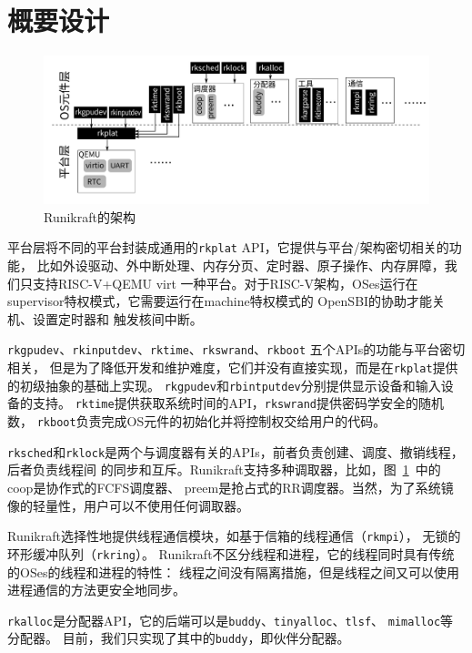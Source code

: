 \documentclass{../runikraft-report}
\begin{document}
\section{概要设计}
\begin{figure}[!hbt]
\centering
\includegraphics[width=\linewidth]{../assets/Runikraft-architecture-impl.pdf}
\caption{Runikraft的架构}\label{fig:runikraft-arch-impl}
\end{figure}
平台层将不同的平台封装成通用的\texttt{rkplat} API，它提供与平台/架构密切相关的功能，
比如外设驱动、外中断处理、内存分页、定时器、原子操作、内存屏障，我们只支持RISC-V+QEMU virt
一种平台。对于RISC-V架构，OSes运行在supervisor特权模式，它需要运行在machine特权模式的
OpenSBI\cite{bib:feasibility-5}\cite{bib:feasibility-6}的协助才能关机、设置定时器和
触发核间中断。

\texttt{rkgpudev}、\texttt{rkinputdev}、\texttt{rktime}、\texttt{rkswrand}、\texttt{rkboot}
五个APIs的功能与平台密切相关，
但是为了降低开发和维护难度，它们并没有直接实现，而是在\texttt{rkplat}提供的初级抽象的基础上实现。
\texttt{rkgpudev}和\texttt{rbintputdev}分别提供显示设备和输入设备的支持。
\texttt{rktime}提供获取系统时间的API，\texttt{rkswrand}提供密码学安全的随机数，
\texttt{rkboot}负责完成OS元件的初始化并将控制权交给用户的代码。

\texttt{rksched}和\texttt{rklock}是两个与调度器有关的APIs，前者负责创建、调度、撤销线程，后者负责线程间
的同步和互斥。Runikraft支持多种调取器，比如，图\ \ref{fig:runikraft-arch-impl}\ 中的
coop是协作式的FCFS调度器、
preem是抢占式的RR调度器。当然，为了系统镜像的轻量性，用户可以不使用任何调取器。

Runikraft选择性地提供线程通信模块，如基于信箱的线程通信（\texttt{rkmpi}），
无锁的环形缓冲队列（\texttt{rkring}）。
Runikraft不区分线程和进程，它的线程同时具有传统的OSes的线程和进程的特性：
线程之间没有隔离措施，但是线程之间又可以使用进程通信的方法更安全地同步。

\texttt{rkalloc}是分配器API，它的后端可以是\texttt{buddy}、\texttt{tinyalloc}、\texttt{tlsf}、
\texttt{mimalloc}等分配器。
目前，我们只实现了其中的\texttt{buddy}，即伙伴分配器。
\end{document}
